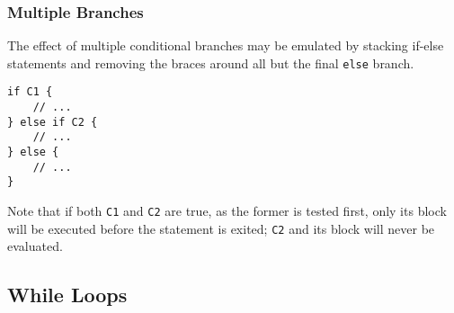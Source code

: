 \subsubsection{Multiple Branches}

The effect of multiple conditional branches may be emulated by stacking if-else statements and removing the braces around all but the final \texttt{else} branch.

\begin{lstlisting}[language=CustomLang]
if C1 {
    // ...
} else if C2 {
    // ...
} else {
    // ...
}
\end{lstlisting}

Note that if both \texttt{C1} and \texttt{C2} are true, as the former is tested first, only its block will be executed before the statement is exited;
\texttt{C2} and its block will never be evaluated.

\subsection{While Loops}

